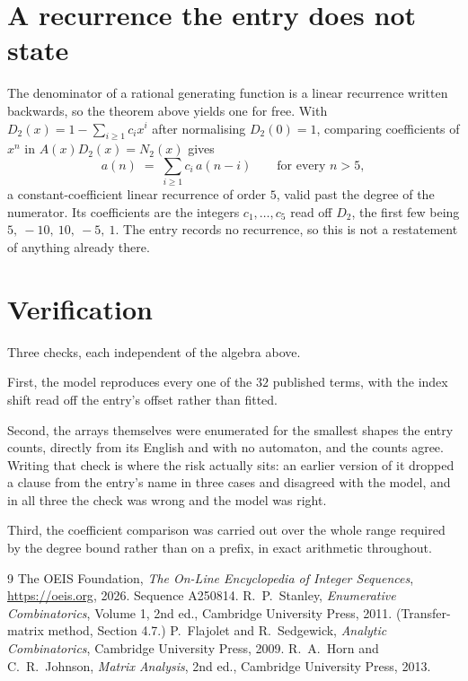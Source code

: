 \documentclass[11pt,a4paper]{article}
\theoremstyle{plain}
\theoremstyle{definition}
\begin{document}
\section{A recurrence the entry does not state}

The denominator of a rational generating function is a linear recurrence written backwards, so
the theorem above yields one for free. With $D_2(x)=1-\sum_{i\ge1}c_ix^i$ after normalising
$D_2(0)=1$, comparing coefficients of $x^n$ in $A(x)D_2(x)=N_2(x)$ gives
\[
a(n)\;=\;\sum_{i\ge1}c_i\,a(n-i)\qquad\text{for every }n>5,
\]
a constant-coefficient linear recurrence of order $5$, valid past the degree of the
numerator. Its coefficients are the integers $c_1,\dots,c_{5}$ read off $D_2$, the first few being $5,\ -10,\ 10,\ -5,\ 1$. The entry records no recurrence, so this is not a restatement of anything
already there.

\section{Verification}

Three checks, each independent of the algebra above.

First, the model reproduces every one of the $32$ published terms, with the index shift
read off the entry's offset rather than fitted.

Second, the arrays themselves were enumerated for the smallest shapes the entry counts,
directly from its English and with no automaton, and the counts agree. Writing that check is
where the risk actually sits: an earlier version of it dropped a clause from the entry's name
in three cases and disagreed with the model, and in all three the check was wrong and the model
was right.

Third, the coefficient comparison was carried out over the whole range required by the degree
bound rather than on a prefix, in exact arithmetic throughout.

\begin{thebibliography}{9}
 The OEIS Foundation, \emph{The On-Line Encyclopedia of Integer
Sequences}, \url{https://oeis.org}, 2026. Sequence A250814.
 R.~P.~Stanley, \emph{Enumerative Combinatorics}, Volume 1, 2nd ed.,
Cambridge University Press, 2011. (Transfer-matrix method, Section 4.7.)
 P.~Flajolet and R.~Sedgewick, \emph{Analytic Combinatorics}, Cambridge
University Press, 2009.
 R.~A.~Horn and C.~R.~Johnson, \emph{Matrix Analysis}, 2nd ed., Cambridge
University Press, 2013.
\end{thebibliography}
\end{document}
